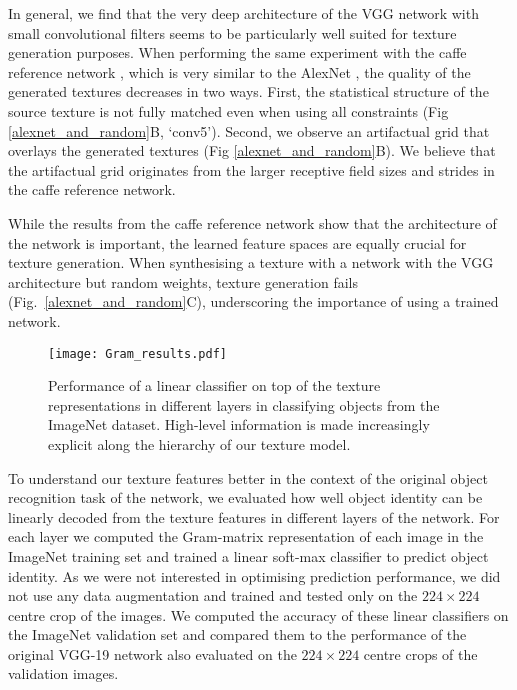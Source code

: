 \documentclass{article} %
\begin{document}
In general, we find that the very deep architecture of the VGG network with small convolutional filters seems to be particularly well suited for texture generation purposes. When performing the same experiment with the caffe reference network \cite{jia_caffe:_2014}, which is very similar to the AlexNet  \cite{krizhevsky_imagenet_2012}, the quality of the generated textures decreases in two ways. First, the statistical structure of the source texture is not fully matched even when using all constraints (Fig \ref{alexnet_and_random}B, `conv5'). Second, we observe an artifactual grid that overlays the generated textures (Fig \ref{alexnet_and_random}B). We believe that the artifactual grid originates from the larger receptive field sizes and strides in the caffe reference network.

While the results from the caffe reference network show that the architecture of the network is important, the learned feature spaces are equally crucial for texture generation. When synthesising a texture with a network with the VGG architecture but random weights, texture generation fails (Fig.~\ref{alexnet_and_random}C), underscoring the importance of using a trained network.

\begin{figure}[]
\begin{center}
\texttt{[image: Gram\_results.pdf]}%
\end{center}
\caption{\label{gram_results} Performance of a linear classifier on top of the texture representations in different layers in classifying objects from the ImageNet dataset. High-level information is made increasingly explicit along the hierarchy of our texture model. }
\end{figure}

To understand our texture features better in the context of the original object recognition task of the network, we evaluated how well object identity can be linearly decoded from the texture features in different layers of the network. For each layer we computed the Gram-matrix representation of each image in the ImageNet training set \cite{russakovsky_imagenet_2014} and trained a linear soft-max classifier to predict object identity. As we were not interested in optimising prediction performance, we did not use any data augmentation and trained and tested only on the $224 \times 224$ centre crop of the images. We computed the accuracy of these linear classifiers on the ImageNet validation set and compared them to the performance of the original VGG-19 network also evaluated on the $224 \times 224$ centre crops of the validation images.
\end{document}
